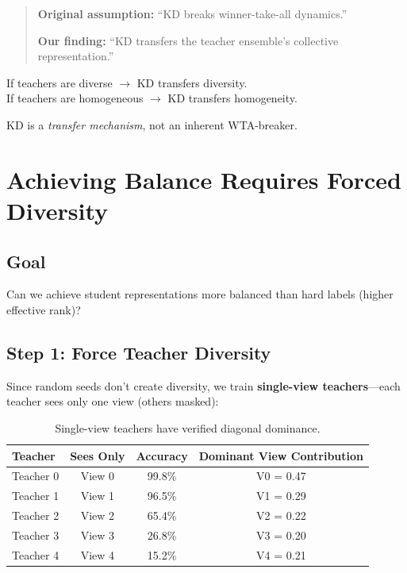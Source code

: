 \documentclass{article}
\begin{document}
\begin{quote}
\textbf{Original assumption:} ``KD breaks winner-take-all dynamics.''

\textbf{Our finding:} ``KD transfers the teacher ensemble's collective representation.''
\end{quote}

If teachers are diverse $\rightarrow$ KD transfers diversity.\\
If teachers are homogeneous $\rightarrow$ KD transfers homogeneity.

KD is a \textit{transfer mechanism}, not an inherent WTA-breaker.

\section{Achieving Balance Requires Forced Diversity}
\label{sec:balance}

\subsection{Goal}

Can we achieve student representations more balanced than hard labels (higher effective rank)?

\subsection{Step 1: Force Teacher Diversity}

Since random seeds don't create diversity, we train \textbf{single-view teachers}---each teacher sees only one view (others masked):

\begin{table}[h]
\centering
\caption{Single-view teachers have verified diagonal dominance.}
\label{tab:forced}
\begin{tabular}{@{}lccc@{}}
\toprule
Teacher & Sees Only & Accuracy & Dominant View Contribution \\
\midrule
Teacher 0 & View 0 & 99.8\% & V0 = 0.47 \\
Teacher 1 & View 1 & 96.5\% & V1 = 0.29 \\
Teacher 2 & View 2 & 65.4\% & V2 = 0.22 \\
Teacher 3 & View 3 & 26.8\% & V3 = 0.20 \\
Teacher 4 & View 4 & 15.2\% & V4 = 0.21 \\
\bottomrule
\end{tabular}
\end{table}
\end{document}
